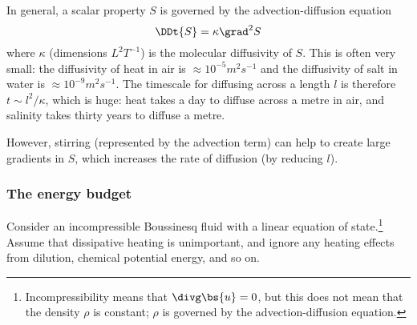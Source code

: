 In general, a scalar property $S$ is governed by the advection-diffusion equation
\begin{equation}
    \DDt{S} = \kappa\grad^2S
\end{equation}
where $\kappa$ (dimensions $L^2T^{-1}$) is the molecular diffusivity of $S$. This is often very small: the diffusivity of heat in air is $\approx10^{-5}m^2s^{-1}$ and the diffusivity of salt in water is $\approx10^{-9}m^2s^{-1}$. The timescale for diffusing across a length $l$ is therefore $t\sim l^2/\kappa$, which is huge: heat takes a day to diffuse across a metre in air, and salinity takes thirty years to diffuse a metre.

However, stirring (represented by the advection term) can help to create large gradients in $S$, which increases the rate of diffusion (by reducing $l$).

\subsubsection{The energy budget}

Consider an incompressible Boussinesq fluid with a linear equation of state.\footnote{Incompressibility means that $\divg\bs{u}=0$, but this does not mean that the density $\rho$ is constant; $\rho$ is governed by the advection-diffusion equation.}
Assume that dissipative heating is unimportant, and ignore any heating effects from dilution, chemical potential energy, and so on. 

